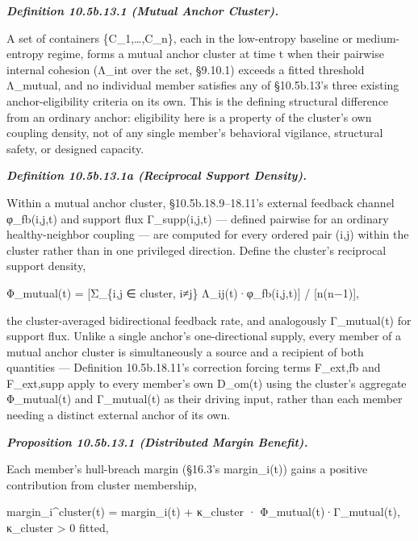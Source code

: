 \documentclass[
]{article}
\begin{document}
\emph{\textbf{Definition 10.5b.13.1 (Mutual Anchor Cluster).}}

A set of containers \{C\_1,\ldots,C\_n\}, each in the low-entropy
baseline or medium-entropy regime, forms a mutual anchor cluster at time
t when their pairwise internal cohesion (Λ\_int over the set, §9.10.1)
exceeds a fitted threshold Λ\_mutual, and no individual member satisfies
any of §10.5b.13's three existing anchor-eligibility criteria on its
own. This is the defining structural difference from an ordinary anchor:
eligibility here is a property of the cluster's own coupling density,
not of any single member's behavioral vigilance, structural safety, or
designed capacity.

\emph{\textbf{Definition 10.5b.13.1a (Reciprocal Support Density).}}

Within a mutual anchor cluster, §10.5b.18.9--18.11's external feedback
channel φ\_fb(i,j,t) and support flux Γ\_supp(i,j,t) --- defined
pairwise for an ordinary healthy-neighbor coupling --- are computed for
every ordered pair (i,j) within the cluster rather than in one
privileged direction. Define the cluster's reciprocal support density,

Φ\_mutual(t) = {[}Σ\_\{i,j ∈ cluster, i≠j\} Λ\_ij(t)·φ\_fb(i,j,t){]} /
{[}n(n−1){]},

the cluster-averaged bidirectional feedback rate, and analogously
Γ\_mutual(t) for support flux. Unlike a single anchor's one-directional
supply, every member of a mutual anchor cluster is simultaneously a
source and a recipient of both quantities --- Definition 10.5b.18.11's
correction forcing terms F\_ext,fb and F\_ext,supp apply to every
member's own D\_om(t) using the cluster's aggregate Φ\_mutual(t) and
Γ\_mutual(t) as their driving input, rather than each member needing a
distinct external anchor of its own.

\emph{\textbf{Proposition 10.5b.13.1 (Distributed Margin Benefit).}}

Each member's hull-breach margin (§16.3's margin\_i(t)) gains a positive
contribution from cluster membership,

margin\_i\^{}cluster(t) = margin\_i(t) + κ\_cluster ·
Φ\_mutual(t)·Γ\_mutual(t), κ\_cluster \textgreater{} 0 fitted,
\end{document}

